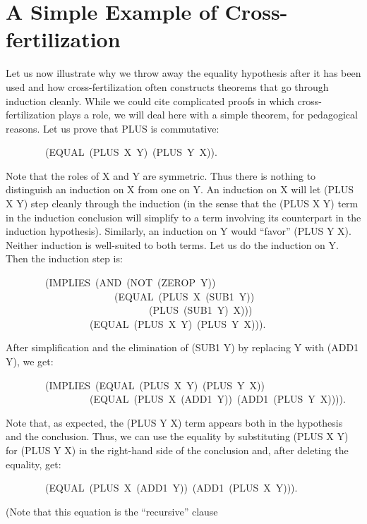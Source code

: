\documentclass[11pt]{book}
\newenvironment{pubasis}{\begin{flushleft}\ttfamily\small}{\normalsize\rmfamily\end{flushleft}}
\newcommand{\pubdefaulttextsize}{\large}
\begin{document}
\section{A Simple Example of Cross-fertilization}
\pubdefaulttextsize
Let us now illustrate why we  throw away the equality
hypothesis after it has been used and how cross-fertilization
often constructs theorems that go through induction cleanly.
While we
could cite complicated proofs in which cross-fertilization plays a role,
we will deal here with a simple theorem, for pedagogical reasons.
Let us prove that PLUS is commutative:
\begin{pubasis}
~~~~~~~~(EQUAL~(PLUS~X~Y)~(PLUS~Y~X)).\\
\end{pubasis}
Note that the roles of X and Y are symmetric.  Thus there is nothing
to distinguish an induction on X from one on Y.  An induction on X will
let (PLUS X Y) step cleanly through the induction (in the sense that
the (PLUS X Y) term in the induction conclusion will simplify
to a term involving its counterpart in the induction hypothesis).
Similarly, an induction on Y would ``favor'' (PLUS Y X).  Neither
induction is well-suited to both terms.  Let us do the induction
on Y.  Then the induction step is:
\begin{pubasis}
~~~~~~~~(IMPLIES~(AND~(NOT~(ZEROP~Y))\\
~~~~~~~~~~~~~~~~~~~~~~(EQUAL~(PLUS~X~(SUB1~Y))\\
~~~~~~~~~~~~~~~~~~~~~~~~~~~~~(PLUS~(SUB1~Y)~X)))\\
~~~~~~~~~~~~~~~~~(EQUAL~(PLUS~X~Y)~(PLUS~Y~X))).\\
\end{pubasis}
After simplification and the elimination of (SUB1 Y) by replacing Y with
(ADD1 Y), we get:
\begin{pubasis}
~~~~~~~~(IMPLIES~(EQUAL~(PLUS~X~Y)~(PLUS~Y~X))\\
~~~~~~~~~~~~~~~~~(EQUAL~(PLUS~X~(ADD1~Y))~(ADD1~(PLUS~Y~X)))).\\
\end{pubasis}
Note that, as expected, the (PLUS Y X) term appears both in the hypothesis
and the conclusion.  Thus, we can use the equality by substituting
(PLUS X Y) for (PLUS Y X) in the right-hand side of the conclusion and,
after deleting the equality, get:
\begin{pubasis}
~~~~~~~~(EQUAL~(PLUS~X~(ADD1~Y))~(ADD1~(PLUS~X~Y))).\\
\end{pubasis}
(Note that this equation is the ``recursive'' clause
\end{document}
